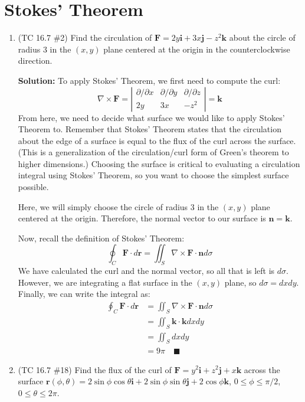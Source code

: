 \documentclass[letterpaper, 11pt]{article}
\begin{document}
\section{Stokes' Theorem}
\begin{enumerate}
\item (TC 16.7 \#2) Find the circulation of $\bm{F} = 2y \bm{i} + 3x \bm{j} - z^2 \bm{k}$ about the circle of radius 3 in the $(x,y)$ plane centered at the origin in the counterclockwise direction. 

\par \textbf{Solution:} To apply Stokes' Theorem, we first need to compute the curl:
\[ \nabla \times \bm{F} = \left| \begin{array}{ccc} \partial / \partial x & \partial / \partial y & \partial / \partial z \\  2y &  3x  & -z^2 \end{array} \right| = \bm{k} \]
From here, we need to decide what surface we would like to apply Stokes' Theorem to. Remember that Stokes' Theorem states that the circulation about the edge of a surface is equal to the flux of the curl across the surface. (This is a generalization of the circulation/curl form of Green's theorem to higher dimensions.) Choosing the surface is critical to evaluating a circulation integral using Stokes' Theorem, so you want to choose the simplest surface possible. 

\par Here, we will simply choose the circle of radius 3 in the $(x,y)$ plane centered at the origin. Therefore, the normal vector to our surface is $\bm{n} = \bm{k}$. 

\par Now, recall the definition of Stokes' Theorem:
\[ \oint_C \bm{F} \cdot d \bm{r} = \iint_S \nabla \times \bm{F} \cdot \bm{n} d \sigma \]
We have calculated the curl and the normal vector, so all that is left is $d \sigma$. However, we are integrating a flat surface in the $(x,y)$ plane, so $d \sigma = dx dy$. Finally, we can write the integral as:
\begin{align*}
\oint_C \bm{F} \cdot d \bm{r} &= \iint_S \nabla \times \bm{F} \cdot \bm{n} d \sigma \\
&= \iint_S \bm{k} \cdot \bm{k} dx dy \\
&= \iint_S dx dy \\
&= 9 \pi \quad\blacksquare
\end{align*}


\item (TC 16.7 \#18) Find the flux of the curl of $\bm{F} = y^2 \bm{i} + z^2 \bm{j} + x \bm{k}$ across the surface $\bm{r}(\phi,\theta) = 2 \sin \phi \cos \theta \bm{i} + 2 \sin \phi\sin \theta\bm{j} + 2\cos \phi \bm{k}$, $ 0 \leq \phi \leq \pi/2$, $0 \leq \theta \leq 2 \pi$. 


\end{enumerate}
\end{document}
